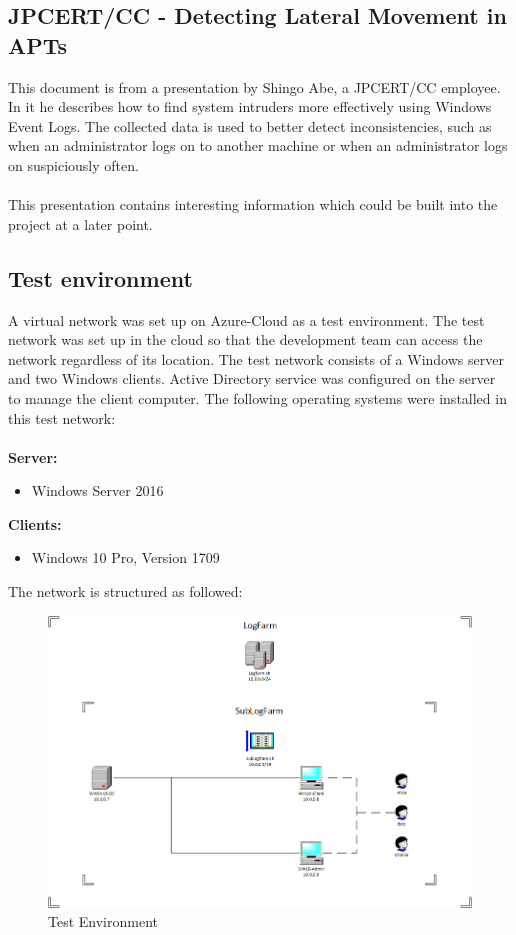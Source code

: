 \subsection{JPCERT/CC - Detecting Lateral Movement in APTs}
This document is from a presentation by Shingo Abe, a JPCERT/CC employee. In it he describes how to find system intruders more effectively using Windows Event Logs. The collected data is used to better detect inconsistencies, such as when an administrator logs on to another machine or when an administrator logs on suspiciously often. 
\\\\
This presentation contains interesting information which could be built into the project at a later point.
\subsection{Test environment}
A virtual network was set up on Azure-Cloud as a test environment. The test network was set up in the cloud so that the development team can access the network regardless of its location. The test network consists of a Windows server and two Windows clients. Active Directory service was configured on the server to manage the client computer. The following operating systems were installed in this test network: \\
\\
\textbf{Server:}
\begin{itemize}
    \item Windows Server 2016
\end{itemize}
\textbf{Clients:}
\begin{itemize}
    \item Windows 10 Pro, Version 1709
\end{itemize}
The network is structured as followed:\\
\begin{figure}[H]
    \centering
    \includegraphics[width=0.9\linewidth]{assets/testnetwork.png}
    \caption{Test Environment}
\end{figure}
